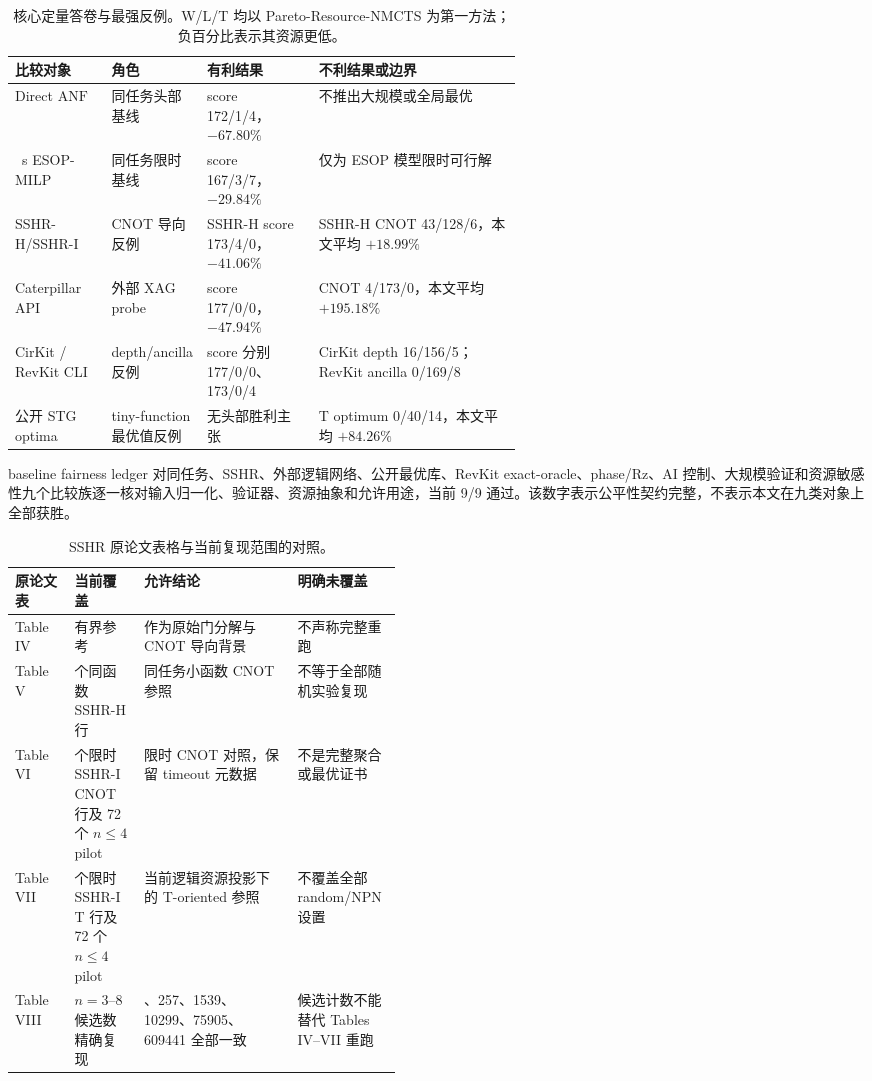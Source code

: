 \documentclass[UTF8,fontset=macnew,11pt]{ctexart}
\newcommand{\method}{Resource-NMCTS}
\newcommand{\anf}{\ensuremath{\mathrm{ANF}}}
\begin{document}
\begin{table}[H]
\centering
\scriptsize
\setlength{\tabcolsep}{2.5pt}
\renewcommand{\arraystretch}{1.06}
\caption{核心定量答卷与最强反例。W/L/T 均以 Pareto-\method{} 为第一方法；负百分比表示其资源更低。}
\label{tab:comparison-answer-zh}
\begin{tabularx}{\linewidth}{>{\raggedright\arraybackslash}p{0.19\linewidth}>{\raggedright\arraybackslash}p{0.18\linewidth}>{\raggedright\arraybackslash}p{0.22\linewidth}>{\raggedright\arraybackslash}X}
\toprule
比较对象 & 角色 & 有利结果 & 不利结果或边界 \\
\midrule
Direct \anf{} & 同任务头部基线 & score 172/1/4，$-67.80\%$ & 不推出大规模或全局最优 \\
10~s ESOP-MILP & 同任务限时基线 & score 167/3/7，$-29.84\%$ & 仅为 ESOP 模型限时可行解 \\
SSHR-H/SSHR-I & CNOT 导向反例 & SSHR-H score 173/4/0，$-41.06\%$ & SSHR-H CNOT 43/128/6，本文平均 $+18.99\%$ \\
Caterpillar API & 外部 XAG probe & score 177/0/0，$-47.94\%$ & CNOT 4/173/0，本文平均 $+195.18\%$ \\
CirKit / RevKit CLI & depth/ancilla 反例 & score 分别 177/0/0、173/0/4 & CirKit depth 16/156/5；RevKit ancilla 0/169/8 \\
公开 STG optima & tiny-function 最优值反例 & 无头部胜利主张 & T optimum 0/40/14，本文平均 $+84.26\%$ \\
\bottomrule
\end{tabularx}
\end{table}

baseline fairness ledger 对同任务、SSHR、外部逻辑网络、公开最优库、RevKit exact-oracle、phase/Rz、AI 控制、大规模验证和资源敏感性九个比较族逐一核对输入归一化、验证器、资源抽象和允许用途，当前 9/9 通过。该数字表示公平性契约完整，不表示本文在九类对象上全部获胜。

\begin{table}[H]
\centering
\scriptsize
\setlength{\tabcolsep}{2.2pt}
\renewcommand{\arraystretch}{1.04}
\caption{SSHR 原论文表格与当前复现范围的对照。}
\label{tab:sshr-crosswalk-zh}
\begin{tabularx}{\linewidth}{l>{\raggedright\arraybackslash}p{0.18\linewidth}>{\raggedright\arraybackslash}X>{\raggedright\arraybackslash}p{0.27\linewidth}}
\toprule
原论文表 & 当前覆盖 & 允许结论 & 明确未覆盖 \\
\midrule
Table IV & 有界参考 & 作为原始门分解与 CNOT 导向背景 & 不声称完整重跑 \\
Table V & 177 个同函数 SSHR-H 行 & 同任务小函数 CNOT 参照 & 不等于全部随机实验复现 \\
Table VI & 177 个限时 SSHR-I CNOT 行及 72 个 $n\leq4$ pilot & 限时 CNOT 对照，保留 timeout 元数据 & 不是完整聚合或最优证书 \\
Table VII & 177 个限时 SSHR-I T 行及 72 个 $n\leq4$ pilot & 当前逻辑资源投影下的 T-oriented 参照 & 不覆盖全部 random/NPN 设置 \\
Table VIII & $n=3$--$8$ 候选数精确复现 & 49、257、1539、10299、75905、609441 全部一致 & 候选计数不能替代 Tables IV--VII 重跑 \\
\bottomrule
\end{tabularx}
\end{table}
\end{document}
